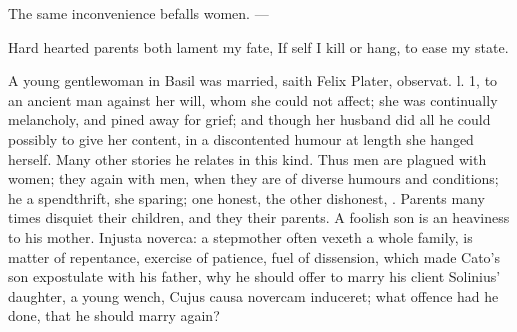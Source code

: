 {The same inconvenience befalls women.
---

Hard hearted parents both lament my fate,
If self I kill or hang, to ease my state.

A young gentlewoman in Basil was married, saith Felix Plater,
observat. l. 1, to an ancient man against her will, whom she could not
affect; she was continually melancholy, and pined away for grief; and
though her husband did all he could possibly to give her content, in a
discontented humour at length she hanged herself. Many other stories he
relates in this kind. Thus men are plagued with women; they again with
men, when they are of diverse humours and conditions; he a spendthrift,
she sparing; one honest, the other dishonest, \etc{}. Parents many times
disquiet their children, and they their parents. A foolish son is
an heaviness to his mother. Injusta noverca: a stepmother often vexeth
a whole family, is matter of repentance, exercise of patience, fuel of
dissension, which made Cato's son expostulate with his father, why he
should offer to marry his client Solinius' daughter, a young wench,
Cujus causa novercam induceret; what offence had he done, that he
should marry again?

}
